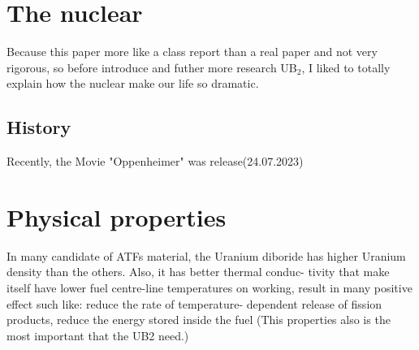 \documentclass[final,11pt,times,twocolumn]{elsarticle}
\begin{document}
\section{The nuclear}
Because this paper more like a class report than a real paper and not very rigorous, so before
introduce and futher more research UB$_{2}$, I liked to totally
explain how the nuclear make our life so dramatic.

\subsection{History}
Recently, the Movie "Oppenheimer" was release(24.07.2023)

\section{Physical properties}
In many candidate of ATFs material, the Uranium 
diboride has higher Uranium density than
the others. Also, it has better thermal conduc-
tivity that make itself have lower fuel centre-line
temperatures on working, result in many positive
effect such like: reduce the rate of temperature-
dependent release of fission products, reduce the
energy stored inside the fuel (This properties also
is the most important that the UB2 need.)
\end{document}
